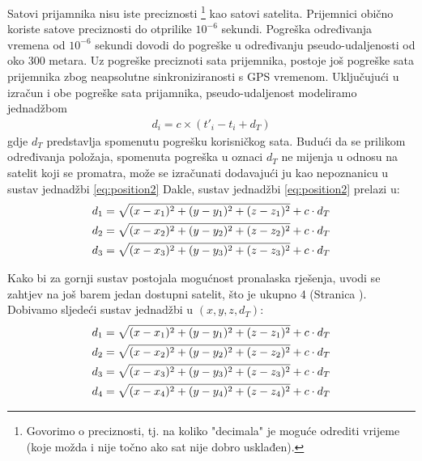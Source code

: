 \documentclass[a4paper,twoside,12pt]{memoir} %
\begin{document}
	Satovi prijamnika nisu iste preciznosti \footnote{Govorimo o preciznosti, tj. na koliko "decimala" je moguće odrediti vrijeme (koje možda i nije točno ako sat nije dobro usklađen).} kao satovi satelita.
	Prijemnici obično koriste satove preciznosti do otprilike $10^{-6}$ sekundi.
	Pogreška određivanja vremena od $10^{-6}$ sekundi dovodi do pogreške u
	određivanju pseudo-udaljenosti od oko 300 metara.
	Uz pogreške preciznoti sata prijemnika, postoje još pogreške sata prijemnika zbog neapsolutne sinkroniziranosti s GPS vremenom.
	Uključujući u izračun i obe pogreške sata prijamnika, pseudo-udaljenost modeliramo jednadžbom
	\begin{align}
	d_i = c\times(t'_i- t_i+ d_T)
	\end{align}
	gdje $d_T$ predstavlja spomenutu pogrešku korisničkog sata.
	Budući da se prilikom određivanja položaja, 
	spomenuta pogreška  u oznaci $d_T$ ne mijenja u odnosu na satelit koji se promatra,
	može se izračunati dodavajući ju kao nepoznanicu u sustav jednadžbi \ref{eq:position2}
	Dakle, sustav jednadžbi \ref{eq:position2} prelazi u:
	\begin{align}\label{eq:position3}
	d_1 = \sqrt{(x-x_1)^{2}+(y-y_1)^{2}+(z-z_1)^{2}} + c\cdot d_T \notag \\
	d_2 = \sqrt{(x-x_2)^{2}+(y-y_2)^{2}+(z-z_2)^{2}} + c\cdot d_T  \\
	d_3 = \sqrt{(x-x_3)^{2}+(y-y_3)^{2}+(z-z_3)^{2}} + c\cdot d_T \notag 
	\end{align}
	
	Kako bi za gornji sustav postojala mogućnost pronalaska rješenja,
	uvodi se zahtjev na još barem jedan dostupni satelit, što je ukupno 4 (Stranica \pageref{stranica:4satelita}).
	Dobivamo sljedeći sustav jednadžbi u $(x,y,z,d_T)$:
	\begin{align}\label{eq:1}
	 d_1 = \sqrt{(x-x_1)^{2}+(y-y_1)^{2}+(z-z_1)^{2}} + c\cdot d_T \notag \\
	 d_2 = \sqrt{(x-x_2)^{2}+(y-y_2)^{2}+(z-z_2)^{2}} + c\cdot d_T  \\
	 d_3 = \sqrt{(x-x_3)^{2}+(y-y_3)^{2}+(z-z_3)^{2}} + c\cdot d_T \notag \\
	 d_4 = \sqrt{(x-x_4)^{2}+(y-y_4)^{2}+(z-z_4)^{2}} + c\cdot d_T \notag
	\end{align}
	
\end{document}
